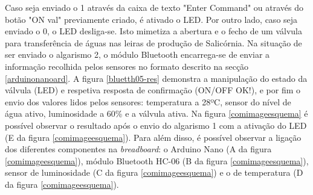 Caso seja enviado o 1 através da caixa de texto "Enter Command" ou através do botão "ON val" previamente criado, é ativado o \ac{LED}. Por outro lado, caso seja enviado o 0,  o \ac{LED} desliga-se. Isto mimetiza a abertura e o fecho de um válvula para transferência de águas nas leiras de produção de Salicórnia. Na situação de ser enviado o algarismo 2, o módulo Bluetooth encarrega-se de enviar a informação recolhida pelos sensores no formato descrito na secção \ref{arduinonanoard}. A figura \ref{bluetth05-res} demonstra a manipulação do estado da válvula (\ac{LED}) e respetiva resposta de confirmação (ON/OFF OK!), e por fim o envio dos valores lidos pelos sensores: temperatura a 28ºC, sensor do nível de água ativo, luminosidade a 60\% e a válvula ativa. Na figura \ref{comimageesquema} é possível observar o resultado após o envio do algarismo 1 com a ativação do \ac{LED} (E da figura \ref{comimageesquema}). Para além disso, é possível observar a ligação dos diferentes componentes na \textit{breadboard}: o Arduino Nano (A da figura \ref{comimageesquema}), módulo Bluetooth HC-06 (B da figura \ref{comimageesquema}), sensor de luminosidade (C da figura \ref{comimageesquema}) e o de temperatura (D da figura \ref{comimageesquema}). 


